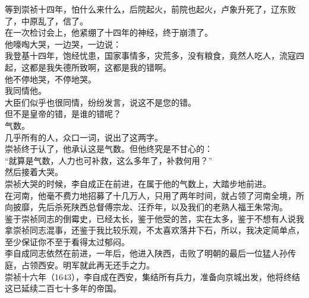 \begin{multicols}{\theparacolNo}
等到崇祯十四年，怕什么来什么，后院起火，前院也起火，卢象升死了，辽东败了，中原乱了，信了。\\

在一次检讨会上，他紧绷了十四年的神经，终于崩溃了。\\

他嚎啕大哭，一边哭，一边说：\\

我登基十四年，饱经忧患，国家事情多，灾荒多，没有粮食，竟然人吃人，流寇四起，这都是我失德所致啊，这都是我的错啊。\\

他不停地哭，不停地哭。\\

我同情他。\\

大臣们似乎也很同情，纷纷发言，说这不是您的错。\\

但不是皇帝的错，是谁的错呢？\\

气数。\\

几乎所有的人，众口一词，说出了这两字。\\

崇祯终于认了，他承认这是气数。但他终究是不甘心的：\\

“就算是气数，人力也可补救，这么多年了，补救何用？”\\

然后接着大哭。\\

崇祯大哭的时候，李自成正在前进，在属于他的气数上，大踏步地前进。\\

在河南，他毫不费力地招募了十几万人，只用了两年时间，就占领了河南全境，所向披靡，先后杀死陕西总督傅宗龙、汪乔年，以及我们的老熟人福王朱常洵。\\

鉴于崇祯同志的倒霉史，已经太长，鉴于他受的苦，实在太多，鉴于不想有人说我拿崇祯同志混事，还鉴于我比较乐观，不太喜欢落井下石，所以，我决定简单点，至少保证你不至于看得太过郁闷。\\

李自成同志依然在前进，一年后，他进入陕西，击败了明朝的最后一位猛人孙传庭，占领西安。明军就此再无还手之力。\\

崇祯十六年（1643），李自成在西安，集结所有兵力，准备向京城出发，他将终结这已延续二百七十多年的帝国。\\


\end{multicols}
